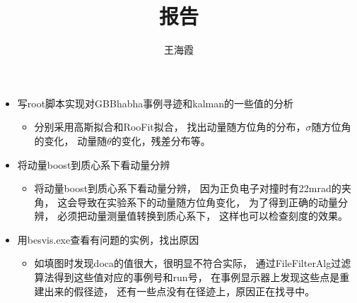 \documentclass{beamer}
\begin{document}
\title{报告}
\author{王海霞}


\maketitle


\begin{frame}
    \begin{itemize}
        \item 写root脚本实现对GBBhabha事例寻迹和kalman的一些值的分析
            \begin{itemize}
                \item 分别采用高斯拟合和RooFit拟合，
                    找出动量随方位角的分布，$\sigma$随方位角的变化，
                    动量随$\theta$的变化，残差分布等。 
            \end{itemize}
        \item 将动量boost到质心系下看动量分辨
            \begin{itemize}
                \item 将动量boost到质心系下看动量分辨，
                    因为正负电子对撞时有22mrad的夹角，
                    这会导致在实验系下的动量随方位角变化，
                    为了得到正确的动量分辨，
                    必须把动量测量值转换到质心系下，
                    这样也可以检查刻度的效果。 
            \end{itemize}
        \item 用besvis.exe查看有问题的实例，找出原因
            \begin{itemize}
                \item 如填图时发现doca的值很大，很明显不符合实际，
                    通过FileFilterAlg过滤算法得到这些值对应的事例号和run号，
                    在事例显示器上发现这些点是重建出来的假径迹，
                    还有一些点没有在径迹上，原因正在找寻中。 
            \end{itemize}
    \end{itemize}
\end{frame}
\end{document}
